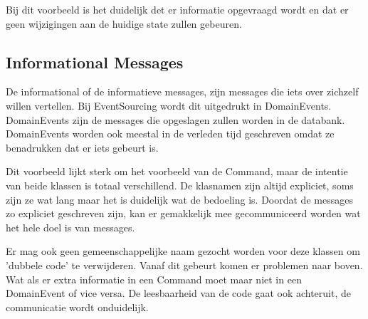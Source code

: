 
Bij dit voorbeeld is het duidelijk det er informatie opgevraagd wordt en dat er geen wijzigingen aan de huidige state zullen gebeuren.

\subsection{Informational Messages}
\label{subsec:informational-messages}

De informational of de informatieve messages, zijn messages die iets over zichzelf willen vertellen. Bij EventSourcing wordt dit uitgedrukt in DomainEvents. DomainEvents zijn de messages die opgeslagen zullen worden in de databank. DomainEvents worden ook meestal in de verleden tijd geschreven omdat ze benadrukken dat er iets gebeurt is.


Dit voorbeeld lijkt sterk om het voorbeeld van de Command, maar de intentie van beide klassen is totaal verschillend. De klasnamen zijn altijd expliciet, soms zijn ze wat lang maar het is duidelijk wat de bedoeling is. Doordat de messages zo expliciet geschreven zijn, kan er gemakkelijk mee gecommuniceerd worden wat het hele doel is van messages.

Er mag ook geen gemeenschappelijke naam gezocht worden voor deze klassen om 'dubbele code' te verwijderen. Vanaf dit gebeurt komen er problemen naar boven. Wat als er extra informatie in een Command moet maar niet in een DomainEvent of vice versa. De leesbaarheid van de code gaat ook achteruit, de communicatie wordt onduidelijk.
